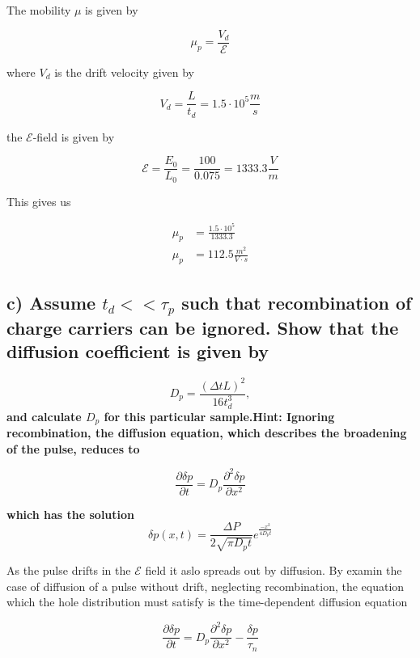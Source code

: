 
The mobility $\mu$ is given by

\begin{equation*}
    \mu_p=\frac{V_d}{\mathscr{E}}
\end{equation*}

where $V_d$ is the drift velocity given by

\begin{equation*}
    V_d=\frac{L}{t_d}=1.5\cdot10^{5}\frac{m}{s}
\end{equation*}

the $\mathscr{E}$-field is given by

\begin{equation*}
    \mathscr{E}=\frac{E_0}{L_0}=\frac{100}{0.075}=1333.3\frac{V}{m}
\end{equation*}

This gives us

\begin{align*}
    \mu_p&=\frac{1.5\cdot10^{5}}{1333.3}\\
    \mu_p&=112.5 \frac{m^2}{V\cdot s}
\end{align*}

\subsection*{c) Assume \( t_{d}<<\tau_{p} \) such that recombination of charge carriers can be ignored. Show that the diffusion coefficient is given by}

\[D_{p}=\frac{(\Delta t L)^{2}}{16 t_{d}^{3}},\]
\textbf{and calculate \( D_{p} \) for this particular sample.Hint: Ignoring recombination, the diffusion equation, which describes the broadening of the pulse, reduces to}

\[\frac{\partial \delta p}{\partial t}=D_{p} \frac{\partial^{2} \delta p}{\partial x^{2}}\]

\textbf{which has the solution}
\[\delta p(x, t)=\frac{\Delta P}{2 \sqrt{\pi D_{p} t}} e^{\frac{-x^{2}}{4 D_{p} t}}\]

As the pulse drifts in the $\mathscr{E}$ field it aslo spreads out by diffusion. By examin the case of diffusion of a pulse without drift, neglecting recombination, the equation which the hole distribution must satisfy is the time-dependent diffusion equation

\begin{equation*}
    \frac{\partial \delta p}{\partial t}=D_{p} \frac{\partial^{2} \delta p}{\partial x^{2}}-\frac{\delta p}{\tau_{n}} 
\end{equation*}

